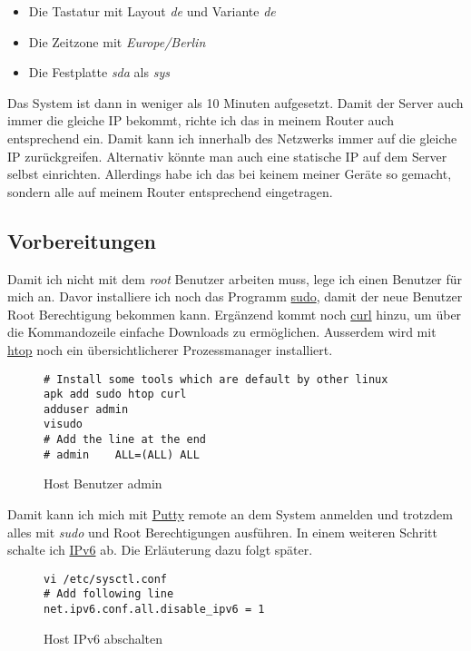 \documentclass[12pt,a4paper]{article}
\newcommand{\code}[1]{\textit{#1}}
\begin{document}
\begin{itemize}
    \item Die Tastatur mit Layout \code{de} und Variante  \code{de}
    \item Die Zeitzone mit \code{Europe/Berlin}
    \item Die Festplatte \code{sda} als \code{sys}
\end{itemize}

Das System ist dann in weniger als 10 Minuten aufgesetzt. Damit der Server auch immer die gleiche IP bekommt, richte ich
das in meinem Router auch entsprechend ein. Damit kann ich innerhalb des Netzwerks immer auf die gleiche IP
zurückgreifen. Alternativ könnte man auch eine statische IP auf dem Server selbst einrichten. Allerdings habe ich das
bei keinem meiner Geräte so gemacht, sondern alle auf meinem Router entsprechend eingetragen.

\subsection{Vorbereitungen}
Damit ich nicht mit dem \code{root} Benutzer arbeiten muss, lege ich einen Benutzer für mich an. Davor installiere ich
noch das Programm \href{https://de.wikipedia.org/wiki/Sudo}{sudo}, damit der neue Benutzer Root Berechtigung bekommen
kann. Ergänzend kommt noch \href{https://curl.haxx.se/}{curl} hinzu, um über die Kommandozeile einfache Downloads zu
ermöglichen. Ausserdem wird mit \href{https://hisham.hm/htop/index.php?page=main}{htop} noch ein übersichtlicherer
Prozessmanager installiert.

\begin{figure}[H]
\begin{lstlisting}
# Install some tools which are default by other linux
apk add sudo htop curl
adduser admin
visudo
# Add the line at the end
# admin    ALL=(ALL) ALL
\end{lstlisting}
\caption{Host Benutzer admin}\label{fig:Host Benutzer admin}
\end{figure}

Damit kann ich mich mit \href{https://www.chiark.greenend.org.uk/~sgtatham/putty/latest.html}{Putty} remote an dem
System anmelden und trotzdem alles mit \code{sudo} und Root Berechtigungen ausführen. In einem weiteren Schritt schalte
ich \href{https://de.wikipedia.org/wiki/IPv6}{IPv6} ab. Die Erläuterung dazu folgt später.

\begin{figure}[H]
\begin{lstlisting}
vi /etc/sysctl.conf
# Add following line
net.ipv6.conf.all.disable_ipv6 = 1
\end{lstlisting}
\caption{Host IPv6 abschalten}\label{fig:IPv6 abschalten}
\end{figure}
\end{document}
